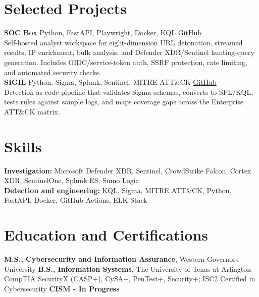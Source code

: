 \documentclass[10pt,letterpaper]{article}
\begin{document}
\section*{Selected Projects}
\textbf{SOC Box} \textbar{} Python, FastAPI, Playwright, Docker, KQL \hfill \href{https://github.com/fredzirbel/SOCBox}{GitHub}\\[-1pt]
Self-hosted analyst workspace for eight-dimension URL detonation, streamed results, IP enrichment, bulk analysis, and Defender XDR/Sentinel hunting-query generation. Includes OIDC/service-token auth, SSRF protection, rate limiting, and automated security checks.\\[2pt]
\textbf{SIGIL} \textbar{} Python, Sigma, Splunk, Sentinel, MITRE ATT\&CK \hfill \href{https://github.com/fredzirbel/SIGIL}{GitHub}\\[-1pt]
Detection-as-code pipeline that validates Sigma schemas, converts to SPL/KQL, tests rules against sample logs, and maps coverage gaps across the Enterprise ATT\&CK matrix.

\section*{Skills}
\textbf{Investigation:} Microsoft Defender XDR, Sentinel, CrowdStrike Falcon, Cortex XDR, SentinelOne, Splunk ES, Sumo Logic\\
\textbf{Detection and engineering:} KQL, Sigma, MITRE ATT\&CK, Python, FastAPI, Docker, GitHub Actions, ELK Stack

\section*{Education and Certifications}
\textbf{M.S., Cybersecurity and Information Assurance}, Western Governors University \quad
\textbf{B.S., Information Systems}, The University of Texas at Arlington\\
CompTIA SecurityX (CASP+), CySA+, PenTest+, Security+; ISC2 Certified in Cybersecurity \quad \textbf{CISM - In Progress}
\end{document}
